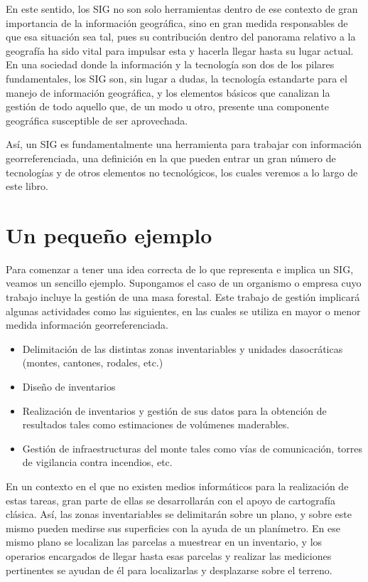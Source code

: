 En este sentido, los SIG no son solo herramientas dentro de ese contexto de gran importancia de la información geográfica, sino en gran medida responsables de que esa situación sea tal, pues su contribución dentro del panorama relativo a la geografía ha sido vital para impulsar esta y hacerla llegar hasta su lugar actual. En una sociedad donde la información y la tecnología son dos de los pilares fundamentales, los SIG son, sin lugar a dudas, la tecnología estandarte para el manejo de información geográfica, y los elementos básicos que canalizan la gestión de todo aquello que, de un modo u otro, presente una componente geográfica susceptible de ser aprovechada.

Así, un SIG es fundamentalmente una herramienta para trabajar con información georreferenciada, una definición en la que pueden entrar un gran número de tecnologías y de otros elementos no tecnológicos, los cuales veremos a lo largo de este libro.


\section{Un pequeño ejemplo}

Para comenzar a tener una idea correcta de lo que representa e implica un SIG, veamos un sencillo ejemplo. Supongamos el caso de un organismo o empresa cuyo trabajo incluye la gestión de una masa forestal. Este trabajo de gestión implicará algunas actividades como las siguientes, en las cuales se utiliza en mayor o menor medida información georreferenciada.

\begin{itemize}
	\item Delimitación de las distintas zonas inventariables y unidades dasocráticas (montes, cantones, rodales, etc.)
	\item Diseño de inventarios
	\item Realización de inventarios y gestión de sus datos para la obtención de resultados tales como estimaciones de volúmenes maderables.
	\item Gestión de infraestructuras del monte tales como vías de comunicación, torres de vigilancia contra incendios, etc.
\end{itemize}

En un contexto en el que no existen medios informáticos para la realización de estas tareas, gran parte de ellas se desarrollarán con el apoyo de cartografía clásica. Así, las zonas inventariables se delimitarán sobre un plano, y sobre este mismo pueden medirse sus superficies con la ayuda de un planímetro. En ese mismo plano se localizan las parcelas a muestrear en un inventario, y los operarios encargados de llegar hasta esas parcelas y realizar las mediciones pertinentes se ayudan de él para localizarlas y desplazarse sobre el terreno.

